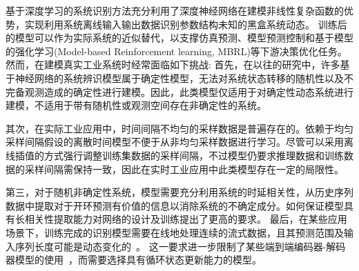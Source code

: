 基于深度学习的系统识别方法充分利用了深度神经网络在建模非线性复杂函数的优势，实现利用系统离线输入输出数据识别参数结构未知的黑盒系统动态。
训练后的模型可以作为实际系统的近似替代，以支撑仿真预测、模型预测控制和基于模型的强化学习(Model-based Reinforcement learning, MBRL)等下游决策优化任务。
然而，在建模真实工业系统时经常面临如下挑战:
首先，在以往的研究中，许多基于神经网络的系统辨识模型属于确定性模型，无法对系统状态转移的随机性以及不完备观测造成的确定性进行建模。因此，此类模型仅适用于对确定性动态系统进行建模，不适用于带有随机性或观测空间存在非确定性的系统。

其次，在实际工业应用中，时间间隔不均匀的采样数据是普遍存在的\cite{kidger2021}。依赖于均匀采样间隔假设的离散时间模型不便于从非均匀采样数据进行学习。尽管可以采用离线插值的方式强行调整训练集数据的采样间隔，不过模型仍要求推理数据和训练数据的采样间隔需保持一致，因此在实时工业应用中此类模型存在一定的局限性。

第三，对于随机非确定性系统，模型需要充分利用系统的时延相关性，从历史序列数据中提取对于开环预测有价值的信息以消除系统的不确定成分。如何保证模型具有长相关性提取能力对网络的设计及训练提出了更高的要求。
最后，在某些应用场景下，训练完成的识别模型需要在线地处理连续的流式数据，且其预测范围及输入序列长度可能是动态变化的~\cite{VSDN_Liu2020}。
这一要求进一步限制了某些端到端编码器-解码器模型的使用~\cite{Rubanova2019,Yildiz2019}，而需要选择具有循环状态更新能力的模型。

